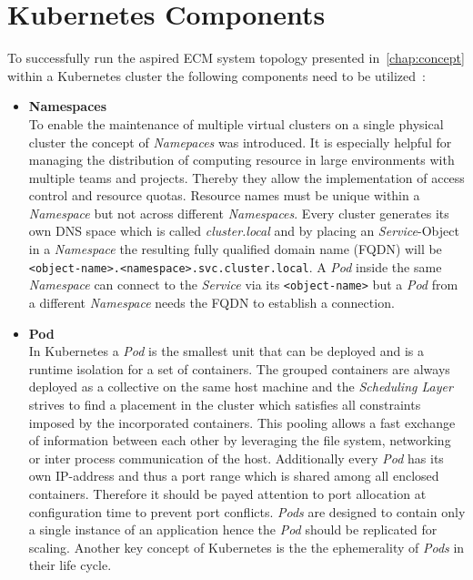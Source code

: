 \section{Kubernetes Components}
To successfully run the aspired ECM system topology presented in~\cref{chap:concept} within a Kubernetes cluster the following components need to be utilized~\cite{KUB,KUB2,KUB3,KUB4}:
\begin{itemize}
    \item[]{\textbf{Namespaces}\\
    To enable the maintenance of multiple virtual clusters on a single physical cluster the concept of \textit{Namepaces} was introduced.
    It is especially helpful for managing the distribution of computing resource in large environments with multiple teams and projects.
    Thereby they allow the implementation of access control and resource quotas.
    Resource names must be unique within a \textit{Namespace} but not across different \textit{Namespaces}.
    Every cluster generates its own DNS space which is called \textit{cluster.local} and by placing an \textit{Service}-Object in a \textit{Namespace} the resulting fully qualified domain name (FQDN) will be \texttt{<object-name>.<namespace>.svc.cluster.local}.
    A \textit{Pod} inside the same \textit{Namespace} can connect to the \textit{Service} via its \texttt{<object-name>} but a \textit{Pod} from a different \textit{Namespace} needs the FQDN to establish a connection.
    }
    \item[]{\textbf{Pod}\\
    In Kubernetes a \textit{Pod} is the smallest unit that can be deployed and is a runtime isolation for a set of containers.
    The grouped containers are always deployed as a collective on the same host machine and the \textit{Scheduling Layer} strives to find a placement in the cluster which satisfies all constraints imposed by the incorporated containers.
    This pooling allows a fast exchange of information between each other by leveraging the file system, networking or inter process communication of the host.
    Additionally every \textit{Pod} has its own IP-address and thus a port range which is shared among all enclosed containers.
    Therefore it should be payed attention to port allocation at configuration time to prevent port conflicts.
    \textit{Pods} are designed to contain only a single instance of an application hence the \textit{Pod} should be replicated for scaling.
    Another key concept of Kubernetes is the the ephemerality of \textit{Pods} in their life cycle.
}
\end{itemize}
